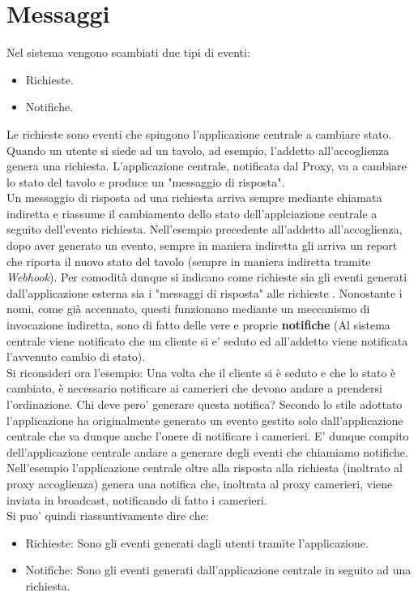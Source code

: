 \section{Messaggi}
Nel sistema vengono scambiati due tipi di eventi:
\begin{itemize}
	\item Richieste.
	\item Notifiche.
\end{itemize}
Le richieste sono eventi che spingono l'applicazione centrale a cambiare stato.
\\Quando un utente si siede ad un tavolo, ad esempio,  l'addetto all'accoglienza genera una richiesta.
L'applicazione centrale, notificata dal Proxy, va a cambiare lo stato del tavolo e produce un "messaggio di risposta".
\\Un messaggio di risposta ad una richiesta arriva sempre mediante chiamata indiretta e riassume il cambiamento dello stato dell'applciazione centrale a seguito dell'evento richiesta.
Nell'esempio precedente all'addetto all'accoglienza, dopo aver generato un evento, sempre in maniera indiretta gli arriva un report che riporta il nuovo stato del tavolo (sempre in maniera indiretta tramite \textit{Webhook}).
Per comodità dunque si indicano come richieste sia gli eventi generati dall'applicazione esterna sia i "messaggi di risposta" alle richieste .
Nonostante i nomi, come già accennato, questi funzionano mediante un meccanismo di invocazione indiretta, sono di fatto delle vere e proprie \textbf{notifiche} (Al sistema centrale viene notificato che un cliente si e' seduto ed all'addetto viene notificata l'avvenuto cambio di stato).
\\Si riconsideri ora l'esempio:
Una volta che il cliente si è seduto e che lo stato è cambiato, è necessario notificare ai camerieri che devono andare a prendersi l'ordinazione. Chi deve pero' generare questa notifica? Secondo lo stile adottato l'applicazione ha originalmente generato un evento gestito solo dall'applicazione centrale che va dunque anche l'onere di notificare i camerieri.
E' dunque compito dell'applicazione centrale andare a generare degli eventi che chiamiamo notifiche.
\\Nell'esempio l'applicazione centrale oltre alla risposta alla richiesta (inoltrato al proxy accoglienza) genera una notifica che, inoltrata al proxy camerieri, viene inviata in broadcast, notificando di fatto i camerieri.
\\Si puo' quindi riassuntivamente dire che:
\begin{itemize}
	\item Richieste: Sono gli eventi generati dagli utenti tramite l'applicazione.
	\item Notifiche: Sono gli eventi generati dall'applicazione centrale in seguito ad una richiesta.
\end{itemize}
